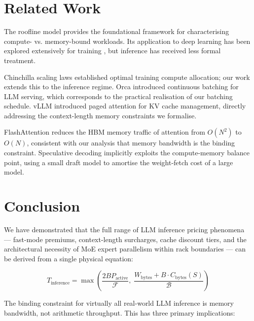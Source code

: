 \documentclass[11pt,a4paper]{article}
\newcommand{\BW}{\mathcal{B}}
\newcommand{\FLOPS}{\mathcal{F}}
\begin{document}
\section{Related Work}
\label{sec:related}

The roofline model \citep{williams2009roofline} provides the foundational
framework for characterising compute- vs. memory-bound workloads. Its
application to deep learning has been explored extensively for training
\citep{jain2019gist}, but inference has received less formal treatment.

Chinchilla scaling laws \citep{hoffmann2022training} established optimal
training compute allocation; our work extends this to the inference regime.
Orca \citep{yu2022orca} introduced continuous batching for LLM serving,
which corresponds to the practical realisation of our batching schedule.
vLLM \citep{kwon2023efficient} introduced paged attention for KV cache
management, directly addressing the context-length memory constraints we
formalise.

FlashAttention \citep{dao2022flashattention} reduces the HBM memory traffic
of attention from $O(N^2)$ to $O(N)$, consistent with our analysis that
memory bandwidth is the binding constraint. Speculative decoding
\citep{leviathan2023fast} implicitly exploits the compute-memory balance
point, using a small draft model to amortise the weight-fetch cost of a
large model.

\section{Conclusion}
\label{sec:conclusion}

We have demonstrated that the full range of LLM inference pricing phenomena —
fast-mode premiums, context-length surcharges, cache discount tiers, and
the architectural necessity of MoE expert parallelism within rack boundaries —
can be derived from a single physical equation:

\[
  T_\text{inference} = \max\!\left(
    \frac{2 B P_\text{active}}{\FLOPS},\;
    \frac{W_\text{bytes} + B \cdot C_\text{bytes}(S)}{\BW}
  \right)
\]

The binding constraint for virtually all real-world LLM inference is memory
bandwidth, not arithmetic throughput. This has three primary implications:
\end{document}
